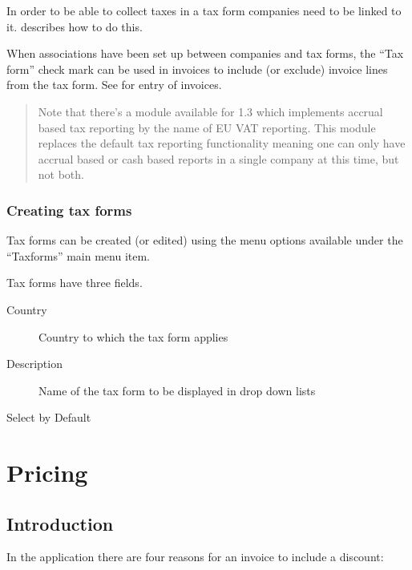 In order to be able to collect taxes in a tax form companies need to be
linked to it.  describes how to do this.

When associations have been set up between companies and
tax forms, the ``Tax form'' check mark can be used in invoices to include
(or exclude) invoice lines from the tax form. See 
for entry of invoices.

\begin{quotation}
Note that there's a module available for 1.3 which implements accrual based tax reporting by
the name of EU VAT reporting. This module replaces the default tax reporting functionality
meaning one can only have accrual based or cash based reports in a single company at this time,
but not both.
\end{quotation}

\subsection{Creating tax forms}
\label{subsec-tax-taxforms-creation}

Tax forms can be created (or edited) using the menu options available under the
``Taxforms'' main menu item.

Tax forms have three fields.

\begin{description}
\item [Country] Country to which the tax form applies
\item [Description] Name of the tax form to be displayed in drop down lists
\item [Select by Default] %
\end{description}



\chapter{Pricing}
\label{cha-pricing}

\section{Introduction}
\label{sec-pricing-introduction}

In the application there are four reasons for an invoice to include a discount:

